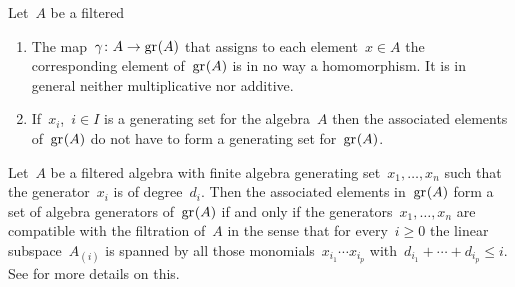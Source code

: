 \begin{warning}
  Let~$A$ be a filtered~{\algebra{$\kf$}}
  \begin{enumerate}
    \item
      The map~$\gamma \colon A \to \gr(A)$ that assigns to each element~$x \in A$ the corresponding element of~$\gr(A)$ is in no way a homomorphism.
      It is in general neither multiplicative nor additive.
    \item
      If~$x_i$,~$i \in I$ is a generating set for the algebra~$A$ then the associated elements of~$\gr(A)$ do not have to form a generating set for~$\gr(A)$.
  \end{enumerate}
\end{warning}


\begin{remark}
  \label{generators of associated graded}
  Let~$A$ be a filtered algebra with finite algebra generating set~$x_1, \dotsc, x_n$ such that the generator~$x_i$ is of degree~$d_i$.
  Then the associated elements in~$\gr(A)$ form a set of algebra generators of~$\gr(A)$ if and only if the generators~$x_1, \dotsc, x_n$ are compatible with the filtration of~$A$ in the sense that for every~$i \geq 0$ the linear subspace~$A_{(i)}$ is spanned by all those monomials~$x_{i_1} \dotsm x_{i_p}$ with~$d_{i_1} + \dotsb + d_{i_p} \leq i$.
  See \cite{associated_generated} for more details on this.
\end{remark}


